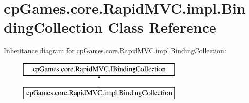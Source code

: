 \hypertarget{classcp_games_1_1core_1_1_rapid_m_v_c_1_1impl_1_1_binding_collection}{}\section{cp\+Games.\+core.\+Rapid\+M\+V\+C.\+impl.\+Binding\+Collection Class Reference}
\label{classcp_games_1_1core_1_1_rapid_m_v_c_1_1impl_1_1_binding_collection}
Inheritance diagram for cp\+Games.\+core.\+Rapid\+M\+V\+C.\+impl.\+Binding\+Collection\+:\begin{figure}[H]
\begin{center}
\leavevmode
\includegraphics[height=2.000000cm]{classcp_games_1_1core_1_1_rapid_m_v_c_1_1impl_1_1_binding_collection}
\end{center}
\end{figure}
